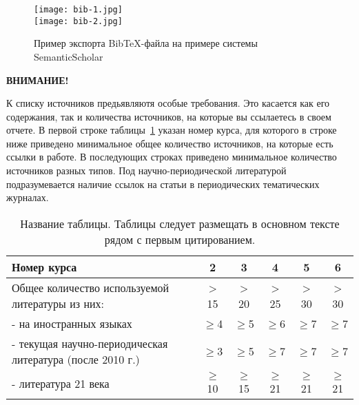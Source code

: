 \begin{figure}[h!]
\begin{center}
\texttt{[image: bib-1.jpg]}\\[2mm]
\texttt{[image: bib-2.jpg]}\\[2mm]
\caption{Пример экспорта Bib\TeX-файла на примере системы SemanticScholar}\label{fig:BibTex}
\end{center}
\end{figure}

\newpage
\textbf{ВНИМАНИЕ!}

К списку источников предьявляютя особые требования. Это касается как его содержания, так и количества источников, на которые вы ссылаетесь в своем отчете. В первой строке таблицы~\ref{tab:lit} указан номер курса, для которого в строке ниже приведено минимальное общее количество источников, на которые есть ссылки в работе. В последующих строках приведено минимальное количество источников разных типов. Под научно-периодической литературой подразумевается наличие ссылок на статьи в периодических тематических журналах.

\begin{table}[h]
\caption{Название таблицы. Таблицы следует размещать в основном тексте рядом с первым цитированием.}
\label{tab:lit}
\begin{center}
\begin{tabular}{|p{7.5 cm}|c|c|c|c|c|}
\hline
 Номер курса & 2 & 3 & 4 & 5 & 6\\
\hline
Общее количество используемой литературы из них: & > 15 & > 20 & > 25 & > 30 & > 30 \\
\hline
- на иностранных языках & $\ge$4 & $\ge$5 & $\ge$6 & $\ge$7 & $\ge$7 \\
\hline
- текущая научно-периодическая литература (после 2010 г.)& $\ge$3 & $\ge$5 & $\ge$7 & $\ge$7 & $\ge$7  \\
\hline
- литература 21 века & $\ge$10 & $\ge$15 & $\ge$21 & $\ge$21 & $\ge$21 \\
\hline
\end{tabular}
\end{center}
\end{table}
